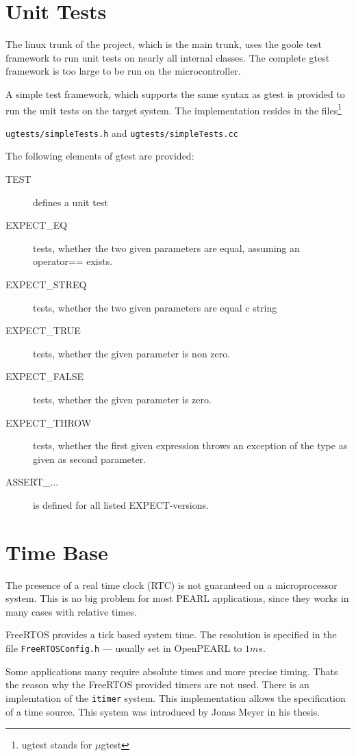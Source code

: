 \section{Unit Tests}
The linux trunk of the project, which is the main trunk, uses the
goole test framework to run unit tests on nearly all internal classes.
The complete gtest framework is too large to be run on the microcontroller.

A simple test framework, which supports the same syntax as gtest is provided
to run the unit tests on the target system.
The implementation resides in the files\footnote{ugtest stands for $\mu$gtest}

 \verb|ugtests/simpleTests.h| and 
 \verb|ugtests/simpleTests.cc| 

The following elements of gtest are provided:
\begin{description}
\item[TEST] defines a unit test
\item[EXPECT\_EQ] tests, whether the two given parameters are equal, 
   assuming an operator== exists.
\item[EXPECT\_STREQ] tests, whether the two given parameters are equal c string 
\item[EXPECT\_TRUE] tests, whether the  given parameter is non zero. 
\item[EXPECT\_FALSE] tests, whether the  given parameter is zero. 
\item[EXPECT\_THROW] tests, whether the first given expression throws
   an exception of the type as given as  second parameter.
\item[ASSERT\_...] is defined for all listed EXPECT-versions. 
\end{description}

\section{Time Base}
The presence of a real time clock (RTC) is not guaranteed on a
microprocessor system.
This is no big problem for most PEARL applications, since they works 
in many cases with relative times.

FreeRTOS provides a tick based system time. The resolution is specified
in the file \texttt{FreeRTOSConfig.h} --- 
usually set in OpenPEARL to $1 ms$.

Some applications many require absolute times and more precise timing.
Thats the reason why the FreeRTOS provided timers are not used. 
There is an implemtation of the \texttt{itimer} system. This 
implementation allows the specification of a time source.
This system was introduced  by Jonas Meyer in his thesis.

